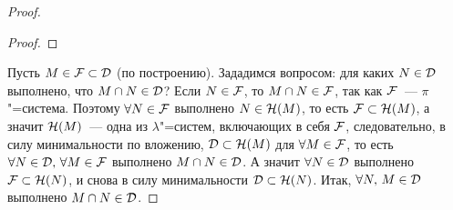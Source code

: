 \begin{theorem}[Дынкин]
\begin{proof}
\begin{lemma}
\begin{proof}
            \end{proof}
        \end{lemma}

        Пусть $M\in\mathcal{F} \subset\mathcal{D}$ (по построению). Зададимся вопросом: для каких $N\in\mathcal{D}$ выполнено, что $M\cap N\in\mathcal{D}$?
        Если $N\in\mathcal{F} $, то $M\cap N\in\mathcal{F} $, так как $\mathcal{F} $~--- $\pi$"=система. Поэтому $\forall N\in\mathcal{F} $
        выполнено $N\in\mathcal{H}(M)$, то есть $\mathcal{F} \subset\mathcal{H}(M)$, а значит $\mathcal{H}(M)$~--- одна из $\lambda$"=систем, включающих в себя 
        $\mathcal{F} $, следовательно, в силу минимальности по вложению, $\mathcal{D}\subset\mathcal{H}(M)$ для $\forall M\in\mathcal{F} $, 
        то есть $\forall N\in\mathcal{D},\, \forall M\in\mathcal{F} $ выполнено $M\cap N\in\mathcal{D}$. А значит $\forall N\in\mathcal{D}$ выполнено $\mathcal{F} \subset\mathcal{H}(N)$, и 
        снова в силу минимальности $\mathcal{D}\subset \mathcal{H}(N)$. Итак, $\forall N,\, M\in\mathcal{D}$ выполнено $M\cap N\in\mathcal{D}$.
        
    \end{proof}
\end{theorem}


